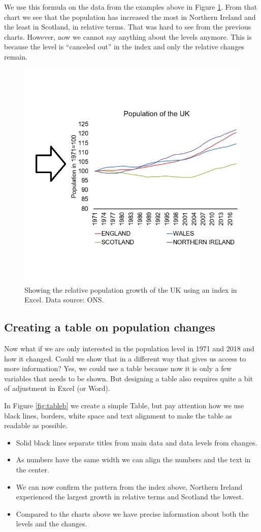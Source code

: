 \documentclass[]{book}
\providecommand{\tightlist}{%
  \setlength{\itemsep}{0pt}\setlength{\parskip}{0pt}}
\begin{document}
We use this formula on the data from the examples above in Figure \ref{fig:index}. From that chart we see that the population has increased the most in Northern Ireland and the least in Scotland, in relative terms. That was hard to see from the previous charts. However, now we cannot say anything about the levels anymore. This is because the level is ``canceled out'' in the index and only the relative changes remain.

\begin{figure}

{\centering \includegraphics[width=0.5\linewidth]{_resources/chapter_people/index} 

}

\caption{Showing the relative population growth of the UK using an index in Excel. Data source: ONS.}\label{fig:index}
\end{figure}

\hypertarget{creating-a-table-on-population-changes}{%
\subsection{Creating a table on population changes}\label{creating-a-table-on-population-changes}}

Now what if we are only interested in the population level in 1971 and 2018 and how it changed. Could we show that in a different way that gives us access to more information? Yes, we could use a table because now it is only a few variables that needs to be shown. But designing a table also requires quite a bit of adjustment in Excel (or Word).

In Figure \ref{fig:tableb} we create a simple Table, but pay attention how we use black lines, borders, white space and text alignment to make the table as readable as possible.

\begin{itemize}
\tightlist
\item
  Solid black lines separate titles from main data and data levels from changes.
\item
  As numbers have the same width we can align the numbers and the text in the center.
\item
  We can now confirm the pattern from the index above, Northern Ireland experienced the largest growth in relative terms and Scotland the lowest.
\item
  Compared to the charts above we have precise information about both the levels and the changes.
\end{itemize}
\end{document}
